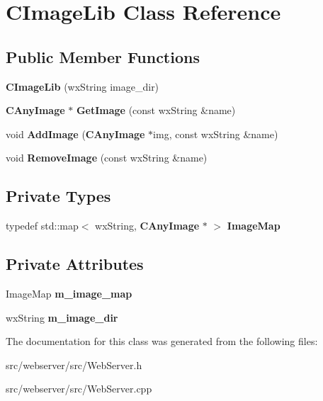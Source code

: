 \section{CImageLib Class Reference}
\label{classCImageLib}
\subsection*{Public Member Functions}
\begin{DoxyCompactItemize}
\item 
{\bfseries CImageLib} (wxString image\_\-dir)\label{classCImageLib_ae92c8a502476d531992fb16098bfa39e}

\item 
{\bf CAnyImage} $\ast$ {\bfseries GetImage} (const wxString \&name)\label{classCImageLib_adcb292badf644b96f636ed3359365c31}

\item 
void {\bfseries AddImage} ({\bf CAnyImage} $\ast$img, const wxString \&name)\label{classCImageLib_a24483f6089c032609505ed62bd9c9145}

\item 
void {\bfseries RemoveImage} (const wxString \&name)\label{classCImageLib_a1c6533ebad94170b1693b28f1a8926c0}

\end{DoxyCompactItemize}
\subsection*{Private Types}
\begin{DoxyCompactItemize}
\item 
typedef std::map$<$ wxString, {\bf CAnyImage} $\ast$ $>$ {\bfseries ImageMap}\label{classCImageLib_a97cf3aee55f9b6bec58806237ef47d1f}

\end{DoxyCompactItemize}
\subsection*{Private Attributes}
\begin{DoxyCompactItemize}
\item 
ImageMap {\bfseries m\_\-image\_\-map}\label{classCImageLib_a1dfcd078546eca6f48886ffb0d29fb4f}

\item 
wxString {\bfseries m\_\-image\_\-dir}\label{classCImageLib_a334007e2eb39b838a754da050b2b60af}

\end{DoxyCompactItemize}


The documentation for this class was generated from the following files:\begin{DoxyCompactItemize}
\item 
src/webserver/src/WebServer.h\item 
src/webserver/src/WebServer.cpp\end{DoxyCompactItemize}
